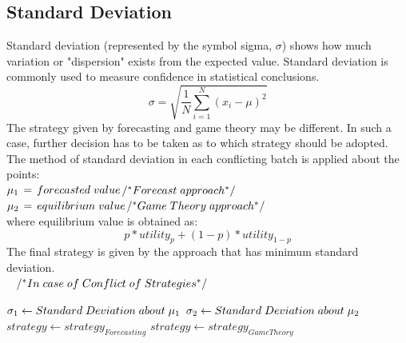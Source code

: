\subsection{ Standard Deviation }
Standard deviation (represented by the symbol sigma, $\sigma$) shows how much variation or "dispersion" exists from the expected value. Standard deviation is commonly used to measure confidence in statistical conclusions.\\
\begin{displaymath}
\sigma = \sqrt{ \frac{1}{N} \sum_{i=1}^{N} (x_i-\mu)^2}
\end{displaymath}
The strategy given by forecasting and game theory may be different. In such a case, further decision has to be taken as to which strategy should be adopted. The method of standard deviation in each conflicting batch is applied about the points:\\[0.3cm]
$\mu_1\hspace*{0.5mm}=\hspace*{0.5mm}forecasted\hspace*{1mm}value$\hspace*{3.5mm}$/^\ast Forecast\hspace*{1mm} approach^\ast/$\\
$\mu_2\hspace*{0.5mm}=\hspace*{0.5mm}equilibrium\hspace*{1mm}value$\hspace*{2mm}$/^\ast Game\hspace*{1mm}Theory\hspace*{1mm}approach^\ast/$\\[0.3cm]
where equilibrium value is obtained as:
\begin{displaymath}
p\ast utility_p + (1-p) \ast utility_{1-p}
\end{displaymath}
The final strategy is given by the approach that has minimum standard deviation.\\[0.3cm]
$\hspace*{3mm}/^\ast In\hspace*{1mm}case\hspace*{1mm}of\hspace*{1mm}Conflict\hspace*{1mm}of\hspace*{1mm}Strategies^\ast/$
\begin{algorithmic}
\STATE $\sigma_1 \gets Standard\hspace*{1mm}Deviation\hspace*{1mm}about\hspace*{1mm}\mu_1$
\STATE $\sigma_2 \gets Standard\hspace*{1mm}Deviation\hspace*{1mm}about\hspace*{1mm}\mu_2$
\vspace{0.2cm}
	\STATE $strategy \gets strategy_{Forecasting}$
\ELSE
	\STATE $strategy \gets strategy_{GameTheory}$
\ENDIF
\end{algorithmic}

